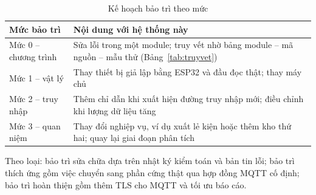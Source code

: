 \begin{table}[H]
\centering
\caption{Kế hoạch bảo trì theo mức}
\label{tab:baotri}
\small
\begin{tabularx}{\textwidth}{L{3.2cm} Y}
\toprule
\textbf{Mức bảo trì} & \textbf{Nội dung với hệ thống này} \\
\midrule
Mức 0 -- chương trình & Sửa lỗi trong một module; truy vết nhờ bảng module -- mã nguồn -- mẫu thử (Bảng~\ref{tab:truyvet}) \\
Mức 1 -- vật lý & Thay thiết bị giả lập bằng ESP32 và đầu đọc thật; thay máy chủ \\
Mức 2 -- truy nhập & Thêm chỉ dẫn khi xuất hiện đường truy nhập mới; điều chỉnh khi lượng dữ liệu tăng \\
Mức 3 -- quan niệm & Thay đổi nghiệp vụ, ví dụ xuất lẻ kiện hoặc thêm kho thứ hai; quay lại giai đoạn phân tích \\
\bottomrule
\end{tabularx}
\end{table}

Theo loại: bảo trì sửa chữa dựa trên nhật ký kiểm toán và bản tin lỗi; bảo trì thích ứng gồm việc chuyển sang phần cứng thật qua hợp đồng MQTT cố định; bảo trì hoàn thiện gồm thêm TLS cho MQTT và tối ưu báo cáo.

